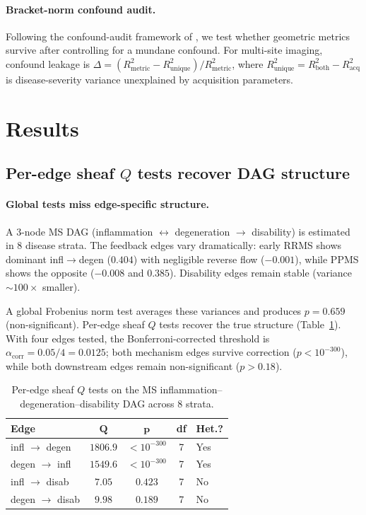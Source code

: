 \documentclass[11pt]{article}
\begin{document}
\paragraph{Bracket-norm confound audit.}
Following the confound-audit framework of \citet{tower2026bracket}, we test whether geometric metrics survive after controlling for a mundane confound. For multi-site imaging, confound leakage is $\Delta = (R^2_{\mathrm{metric}} - R^2_{\mathrm{unique}}) / R^2_{\mathrm{metric}}$, where $R^2_{\mathrm{unique}} = R^2_{\mathrm{both}} - R^2_{\mathrm{acq}}$ is disease-severity variance unexplained by acquisition parameters.

\section{Results}
\label{sec:results}

\subsection{Per-edge sheaf $Q$ tests recover DAG structure}
\label{sec:res-dag}

\paragraph{Global tests miss edge-specific structure.}
A 3-node MS DAG (inflammation $\leftrightarrow$ degeneration $\to$ disability) is estimated in 8 disease strata.
The feedback edges vary dramatically: early RRMS shows dominant infl$\to$degen ($0.404$) with negligible reverse flow ($-0.001$), while PPMS shows the opposite ($-0.008$ and $0.385$).
Disability edges remain stable (variance $\sim\!100\times$ smaller).

A global Frobenius norm test averages these variances and produces $p = 0.659$ (non-significant).
Per-edge sheaf $Q$ tests recover the true structure (Table~\ref{tab:dag}). With four edges tested, the Bonferroni-corrected threshold is $\alpha_{\mathrm{corr}} = 0.05/4 = 0.0125$; both mechanism edges survive correction ($p < 10^{-300}$), while both downstream edges remain non-significant ($p > 0.18$).

\begin{table}[t]
\centering
\caption{Per-edge sheaf $Q$ tests on the MS inflammation--degeneration--disability DAG across 8 strata.}
\label{tab:dag}
\small
\begin{tabular}{@{}lcccl@{}}
\toprule
\textbf{Edge} & $\boldsymbol{Q}$ & $\boldsymbol{p}$ & \textbf{df} & \textbf{Het.?} \\
\midrule
infl $\to$ degen & $1806.9$ & $< 10^{-300}$ & 7 & Yes \\
degen $\to$ infl & $1549.6$ & $< 10^{-300}$ & 7 & Yes \\
infl $\to$ disab & $7.05$ & $0.423$ & 7 & No \\
degen $\to$ disab & $9.98$ & $0.189$ & 7 & No \\
\bottomrule
\end{tabular}
\end{table}
\end{document}
